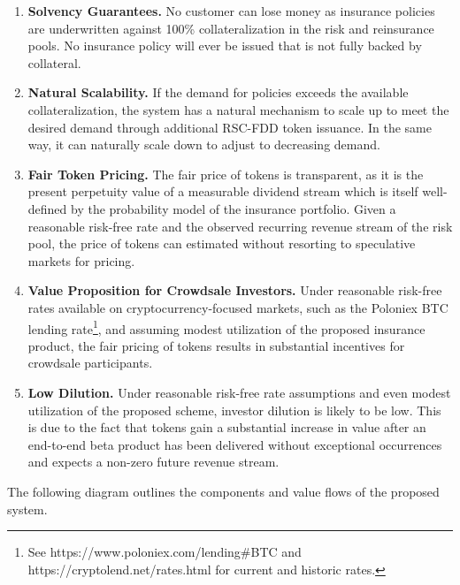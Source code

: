 \documentclass[12pt]{article}
\begin{document}
\begin{enumerate}
    \item \textbf{Solvency Guarantees.} No customer can lose money as insurance policies are underwritten against 100\% collateralization in the risk and reinsurance pools. No insurance policy will ever be issued that is not fully backed by collateral.

    \item \textbf{Natural Scalability.} If the demand for policies exceeds the available collateralization, the system has a natural mechanism to scale up to meet the desired demand through additional RSC-FDD token issuance. In the same way, it can naturally scale down to adjust to decreasing demand.

    \item \textbf{Fair Token Pricing.} The fair price of tokens is transparent, as it is the present perpetuity value of a measurable dividend stream which is itself well-defined by the probability model of the insurance portfolio. Given a reasonable risk-free rate and the observed recurring revenue stream of the risk pool, the price of tokens can estimated without resorting to speculative markets for pricing.

    \item \textbf{Value Proposition for Crowdsale Investors.} Under reasonable risk-free rates available on cryptocurrency-focused markets, such as the Poloniex BTC lending rate\footnote{ See https://www.poloniex.com/lending#BTC and https://cryptolend.net/rates.html for current and historic rates.}, and assuming modest utilization of the proposed insurance product, the fair pricing of tokens results in substantial incentives for crowdsale participants.

    \item \textbf{Low Dilution.} Under reasonable risk-free rate assumptions and even modest utilization of the proposed scheme, investor dilution is likely to be low. This is due to the fact that tokens gain a substantial increase in value after an end-to-end beta product has been delivered without exceptional occurrences and expects a non-zero future revenue stream.
\end{enumerate}

The following diagram outlines the components and value flows of the proposed system.
\end{document}
